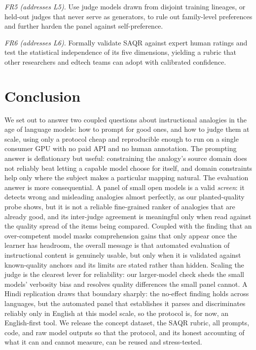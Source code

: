 \documentclass[11pt]{article}
\begin{document}
\emph{FR5 (addresses L5).} Use judge models drawn from disjoint training lineages, or held-out judges
that never serve as generators, to rule out family-level preferences and further harden the panel
against self-preference.

\emph{FR6 (addresses L6).} Formally validate SAQR against expert human ratings and test the
statistical independence of its five dimensions, yielding a rubric that other researchers and edtech
teams can adopt with calibrated confidence.

\section{Conclusion}
\label{sec:conclusion}
We set out to answer two coupled questions about instructional analogies in the age of
language models: how to prompt for good ones, and how to judge them at scale, using only a
protocol cheap and reproducible enough to run on a single consumer GPU with no paid API and
no human annotation. The prompting answer is deflationary but useful: constraining
the analogy's source domain does not reliably beat letting a capable model choose for
itself, and domain constraints help only where the subject makes a particular mapping
natural. The evaluation answer is more consequential. A panel of small open models is a
valid \emph{screen}: it detects wrong and misleading analogies almost perfectly, as our
planted-quality probe shows, but it is not a reliable fine-grained ranker of analogies that
are already good, and its inter-judge agreement is meaningful only when read against the
quality spread of the items being compared. Coupled with the finding that an over-competent
model masks comprehension gains that only appear once the learner has headroom, the overall
message is that automated evaluation of instructional content is genuinely usable, but only
when it is validated against known-quality anchors and its limits are stated rather than
hidden. Scaling the judge is the clearest lever for reliability: our larger-model check sheds
the small models' verbosity bias and resolves quality differences the small panel cannot. A
Hindi replication draws that boundary sharply: the no-effect finding holds across
languages, but the automated panel that establishes it parses and discriminates reliably only
in English at this model scale, so the protocol is, for now, an English-first tool. We release
the concept dataset, the SAQR rubric, all prompts, code, and raw model
outputs so that the protocol, and its honest accounting of what it can and cannot
measure, can be reused and stress-tested.
\end{document}
